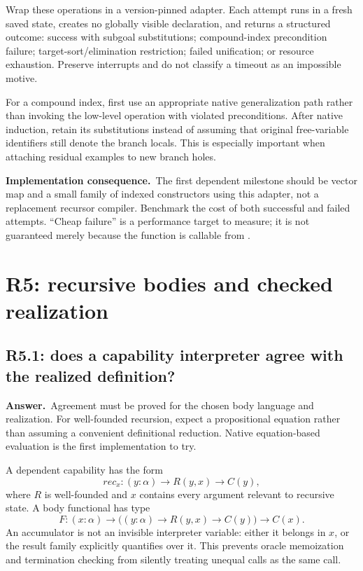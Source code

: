 \documentclass[11pt,a4paper]{article}
\theoremstyle{definition}
\theoremstyle{remark}
\newcommand{\code}[1]{\texttt{\detokenize{#1}}}
\newcommand{\ans}{\noindent\textbf{Answer.}\ }
\newcommand{\imp}{\par\noindent\textbf{Implementation consequence.}\ }
\begin{document}
Wrap these operations in a version-pinned adapter. Each attempt runs in a
fresh saved state, creates no globally visible declaration, and returns a
structured outcome: success with subgoal substitutions; compound-index
precondition failure; target-sort/elimination restriction; failed unification;
or resource exhaustion. Preserve interrupts and do not classify a timeout as
an impossible motive.

For a compound index, first use an appropriate native generalization path
rather than invoking the low-level operation with violated preconditions.
After native induction, retain its substitutions instead of assuming that
original free-variable identifiers still denote the branch locals. This is
especially important when attaching residual examples to new branch holes.

\imp The first dependent milestone should be vector map and a small family of
indexed constructors using this adapter, not a replacement recursor compiler.
Benchmark the cost of both successful and failed attempts. ``Cheap failure''
is a performance target to measure; it is not guaranteed merely because the
function is callable from \code{MetaM}.

\section{R5: recursive bodies and checked realization}\label{sec:r5}

\subsection{R5.1: does a capability interpreter agree with the realized definition?}\label{q:R5.1}
\ans Agreement must be proved for the chosen body language and realization.
For well-founded recursion, expect a propositional equation rather than
assuming a convenient definitional reduction. Native equation-based evaluation
is the first implementation to try.

A dependent capability has the form
\[
 \mathit{rec}_x:(y:\alpha)\to R(y,x)\to C(y),
\]
where $R$ is well-founded and $x$ contains every argument relevant to recursive
state. A body functional has type
\[
 F:(x:\alpha)\to\bigl((y:\alpha)\to R(y,x)\to C(y)\bigr)\to C(x).
\]
An accumulator is not an invisible interpreter variable: either it belongs in
$x$, or the result family explicitly quantifies over it. This prevents oracle
memoization and termination checking from silently treating unequal calls as
the same call.
\end{document}
